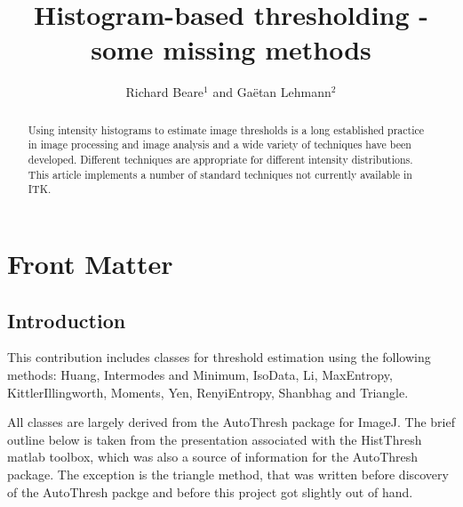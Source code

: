 \documentclass{InsightArticle}
\title{Histogram-based thresholding - some missing methods}
\author{Richard Beare{$^1$} {\small{and}} Ga\"etan Lehmann{$^2$}}
\newcommand{\IJhandlerIDnumber}{}
\begin{document}
%
% 
\IJhandlefooter{\IJhandlerIDnumber}{3279}

\maketitle

\ifhtml
\chapter*{Front Matter\label{front}}
\fi


\begin{abstract}
\noindent
Using intensity histograms to estimate image thresholds is a long
established practice in image processing and image analysis and a wide
variety of techniques have been developed. Different techniques are
appropriate for different intensity distributions. This article
implements a number of standard techniques not currently available in
ITK.
\end{abstract}

\IJhandlenote{\IJhandlerIDnumber}

\tableofcontents

\section{Introduction}
This contribution includes classes for threshold estimation using the
following methods: Huang\cite{huang1995image},
Intermodes and Minimum\cite{prewitt1965analysis}, IsoData\cite{ridler1978picture},
Li\cite{li1993minimum,li1998iterative}, MaxEntropy\cite{kapur1985new},
KittlerIllingworth\cite{kittler1986minimum},
Moments\cite{tsai1985moment}, Yen\cite{yen1995new},
RenyiEntropy\cite{kapur1985new},
Shanbhag\cite{shanbhag1994utilization} and
Triangle\cite{zack1977automatic}.

All classes are largely derived from the AutoThresh
\cite{LandiniImageJ} package for ImageJ. The brief outline below is
taken from the presentation associated with the
HistThresh\cite{HistThreshMatlab} matlab toolbox, which was also a
source of information for the AutoThresh package. The exception is the
triangle method, that was written before discovery of the AutoThresh
packge and before this project got slightly out of hand.
\end{document}

